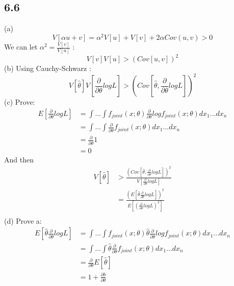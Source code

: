 \documentclass{article}
\begin{document}
\begin{CJK*}{GBK}{song}
\section{6.6}
 (a)
 \begin{equation}
 V[\alpha u+v]=\alpha^2 V[u]+V[v]+2\alpha Cov(u,v)>0
 \end{equation}
We can let $\alpha^2=\frac{V[v]}{V[u]}$ :
\begin{equation}
V[v]V[u]>(Cov[u,v])^2
\end{equation}
 (b)
 Using Cauchy-Schwarz :
 \begin{equation}
 V[\hat{\theta}]V[\frac{\partial}{\partial \theta }logL]>(Cov[\hat{\theta},\frac{\partial}{\partial \theta }logL])^2
 \end{equation}
 (c)
 Prove:
 \begin{equation}
 \begin{aligned}
 E[\frac{\partial}{\partial\theta}logL]&=\int...\int f_{joint}(x;\theta)\frac{\partial}{\partial \theta}log f_{joint}(x;\theta)dx_1...dx_n\\
 &=\int...\int \frac{\partial}{\partial \theta} f_{joint}(x;\theta)dx_1...dx_n\\
 &=\frac{\partial}{\partial\theta}1\\
 &=0
 \end{aligned}
 \end{equation}
 And then
 \begin{equation}
 \begin{aligned}
 V[\hat{\theta}]&>\frac{(Cov[\hat{\theta},\frac{\partial}{\partial \theta }logL])^2}{V[\frac{\partial}{\partial \theta }logL]}\\
 &=\frac{(E[\hat{\theta}\frac{\partial}{\partial \theta }logL])^2}{E[(\frac{\partial}{\partial \theta }logL)^2]}\\
 \end{aligned}
 \end{equation}
 (d)
 Prove a:
  \begin{equation}
 \begin{aligned}
 E[\hat{\theta}\frac{\partial}{\partial\theta}logL]&=\int...\int f_{joint}(x;\theta)\hat{\theta}\frac{\partial}{\partial \theta}log f_{joint}(x;\theta)dx_1...dx_n\\
 &=\int...\int \hat{\theta}\frac{\partial}{\partial \theta} f_{joint}(x;\theta)dx_1...dx_n\\
 &=\frac{\partial}{\partial\theta}E[\hat{\theta}]\\
 &=1+\frac{\partial b}{\partial \theta}
 \end{aligned}

\end{equation}
\end{CJK*}
\end{document}
